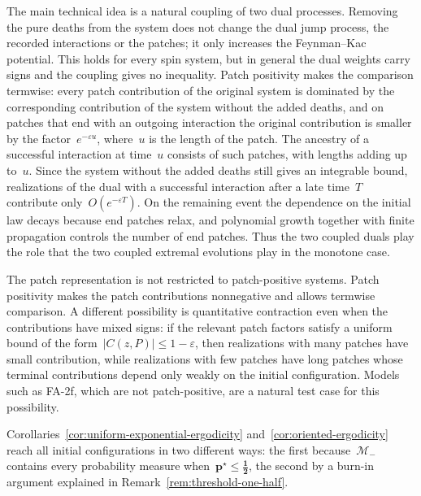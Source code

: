\documentclass[EJP,preprint,NODS,nobera]{ejpecp}
\newcommand{\abs}[1]{\left|#1\right|}
\newcommand{\mb}[1]{\mathbf{#1}}
\newcommand{\mbs}[1]{\boldsymbol{#1}}
\begin{document}
The main technical idea is a natural coupling of two dual processes.
Removing the pure deaths from the system does not change the dual jump
process, the recorded interactions or the patches; it only increases the
Feynman--Kac potential. This holds for every spin system, but in general the
dual weights carry signs and the coupling gives no inequality. Patch
positivity makes the comparison termwise:
every patch contribution of the original system is dominated by the
corresponding contribution of the system without the added deaths, and on
patches that end with an outgoing interaction the original contribution is
smaller by the factor~$e^{-\varepsilon u}$, where~$u$ is the length of the
patch. The ancestry of a successful interaction at time~$u$ consists of such
patches, with lengths adding up to~$u$. Since the system without the added
deaths still gives an integrable bound, realizations
of the dual with a successful interaction after a late time~$T$ contribute
only~$O(e^{-\varepsilon T})$. On the remaining event the dependence on the
initial law decays because end patches relax, and polynomial growth together
with finite propagation controls the number of end patches. Thus the two
coupled duals play the role that the two coupled extremal evolutions play in
the monotone case.

The patch representation is not restricted to patch-positive systems. Patch
positivity makes the patch contributions nonnegative and allows termwise
comparison. A different possibility is quantitative contraction even when the
contributions have mixed signs: if the relevant patch factors satisfy a
uniform bound of the form~$\abs{C(z,P)}\leq1-\varepsilon$, then realizations
with many patches have small contribution, while realizations with few
patches have long patches whose terminal contributions depend only weakly on
the initial configuration. Models such as FA-2f, which are not
patch-positive, are a natural test case for this possibility.

Corollaries~\ref{cor:uniform-exponential-ergodicity}
and~\ref{cor:oriented-ergodicity} reach all initial configurations in two
different ways: the first because~$\mathcal M_-$ contains every probability
measure when~$\mb p^\star\leq\mbs{\tfrac12}$, the second by a burn-in
argument explained in Remark~\ref{rem:threshold-one-half}.
\end{document}
